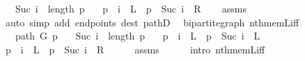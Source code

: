 \begin{isabellebody}
\ \ \ {\isachardoublequoteopen}Suc\ i\ {\isacharless}{\kern0pt}\ length\ p{\isachardoublequoteclose}\isanewline
\ \ \ {\isachardoublequoteopen}p\ {\isacharbang}{\kern0pt}\ i\ {\isasymin}\ L\ {\isasymlongleftrightarrow}\ p\ {\isacharbang}{\kern0pt}\ {\isacharparenleft}{\kern0pt}Suc\ i{\isacharparenright}{\kern0pt}\ {\isasymin}\ R{\isachardoublequoteclose}%
\endisataginvisible
{\isafoldinvisible}%
%
\isadeliminvisible
\isanewline
%
\endisadeliminvisible
%
\isadelimproof
\ \ %
\endisadelimproof
%
\isatagproof
{}\isamarkupfalse%
\ assms\isanewline
\ \ \isamarkupfalse%
\ {\isacharparenleft}{\kern0pt}auto\ simp\ add{\isacharcolon}{\kern0pt}\ endpoints\ dest{\isacharcolon}{\kern0pt}\ pathD{\isacharunderscore}{\kern0pt}{}{\isacharparenright}{\kern0pt}%
\endisatagproof
{\isafoldproof}%
%
\isadelimproof
\isanewline
%
\endisadelimproof
%
\isadeliminvisible
\isanewline
%
\endisadeliminvisible
%
\isataginvisible
{}\isamarkupfalse%
\ {\isacharparenleft}{\kern0pt}\ bipartite{\isacharunderscore}{\kern0pt}graph{\isacharparenright}{\kern0pt}\ nth{\isacharunderscore}{\kern0pt}mem{\isacharunderscore}{\kern0pt}L{\isacharunderscore}{\kern0pt}iff{\isacharunderscore}{\kern0pt}{}{\isacharcolon}{\kern0pt}\isanewline
\ \ \ {\isachardoublequoteopen}path\ G\ p{\isachardoublequoteclose}\isanewline
\ \ \ {\isachardoublequoteopen}Suc\ i\ {\isacharless}{\kern0pt}\ length\ p{\isachardoublequoteclose}\isanewline
\ \ \ {\isachardoublequoteopen}p\ {\isacharbang}{\kern0pt}\ i\ {\isasymin}\ L\ {\isasymlongleftrightarrow}\ p\ {\isacharbang}{\kern0pt}\ {\isacharparenleft}{\kern0pt}Suc\ i{\isacharparenright}{\kern0pt}\ {\isasymnotin}\ L{\isachardoublequoteclose}%
\endisataginvisible
{\isafoldinvisible}%
%
\isadeliminvisible
\isanewline
%
\endisadeliminvisible
%
\isadelimproof
%
\endisadelimproof
%
\isatagproof
{}\isamarkupfalse%
\ {\isacharminus}{\kern0pt}\isanewline
\ \ \isamarkupfalse%
\ {\isachardoublequoteopen}p\ {\isacharbang}{\kern0pt}\ i\ {\isasymin}\ L\ {\isasymlongleftrightarrow}\ p\ {\isacharbang}{\kern0pt}\ {\isacharparenleft}{\kern0pt}Suc\ i{\isacharparenright}{\kern0pt}\ {\isasymin}\ R{\isachardoublequoteclose}\isanewline
\ \ \ \ \isamarkupfalse%
\ assms\isanewline
\ \ \ \ \isamarkupfalse%
\ {\isacharparenleft}{\kern0pt}intro\ nth{\isacharunderscore}{\kern0pt}mem{\isacharunderscore}{\kern0pt}L{\isacharunderscore}{\kern0pt}iff{\isacharparenright}{\kern0pt}\isanewline

\end{isabellebody}
